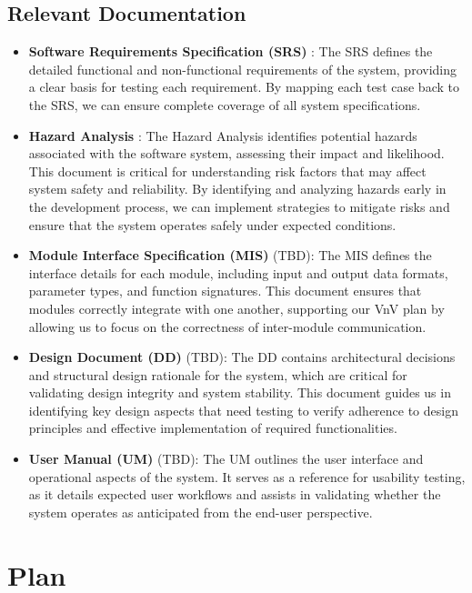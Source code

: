 \documentclass[12pt, titlepage]{article}
\begin{document}
\subsection{Relevant Documentation}

\begin{itemize}
  \item \textbf{Software Requirements Specification (SRS)} \citep{SRS}: The SRS defines the detailed functional and non-functional requirements of the system, providing a clear basis for testing each requirement. By mapping each test case back to the SRS, we can ensure complete coverage of all system specifications. 

  \item \textbf{Hazard Analysis} \citep{Hazard-Analysis}: The Hazard Analysis identifies potential hazards associated with the software system, assessing their impact and likelihood. This document is critical for understanding risk factors that may affect system safety and reliability. By identifying and analyzing hazards early in the development process, we can implement strategies to mitigate risks and ensure that the system operates safely under expected conditions.

  \item \textbf{Module Interface Specification (MIS)} (TBD): The MIS defines the interface details for each module, including input and output data formats, parameter types, and function signatures. This document ensures that modules correctly integrate with one another, supporting our VnV plan by allowing us to focus on the correctness of inter-module communication.

  \item \textbf{Design Document (DD)} (TBD): The DD contains architectural decisions and structural design rationale for the system, which are critical for validating design integrity and system stability. This document guides us in identifying key design aspects that need testing to verify adherence to design principles and effective implementation of required functionalities.
  \item \textbf{User Manual (UM)} (TBD): The UM outlines the user interface and operational aspects of the system. It serves as a reference for usability testing, as it details expected user workflows and assists in validating whether the system operates as anticipated from the end-user perspective.
\end{itemize}

\section{Plan}
\end{document}

